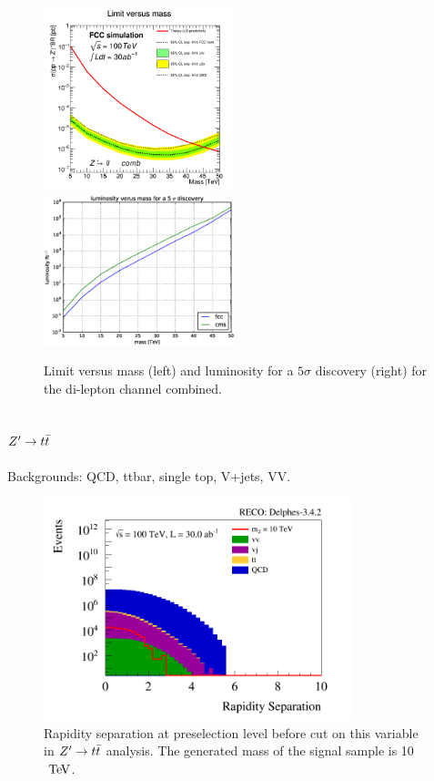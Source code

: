 \documentclass{cernrep}
\begin{document}
\begin{figure}[!htb]\centering
\includegraphics[width=0.495\textwidth]{Fig/lim_Zprime_ll_fcc_cms.png}
\includegraphics[width=0.495\textwidth]{Fig/DiscoveryPotential_ll.eps}
\caption{Limit versus mass (left) and luminosity for a $5\sigma$ discovery (right) for the
 di-lepton channel combined.}
\label{fig:zpll_lim}
\end{figure}

\subsection{$Z^{\prime} \rightarrow t\bar{t}$}
\label{subsec:Zptt}

Backgrounds: QCD, ttbar, single top, V+jets, VV. 

\begin{figure}[!htb]\centering
\includegraphics[width=0.8\textwidth]{Fig/Zptt/rapiditySeparation_sel0_nostack_log.png}
\caption{Rapidity separation at preselection level before cut on this variable in $Z^{\prime} \rightarrow t\bar{t}$ analysis. The generated mass of the signal sample is 10 $\TeV$.}
\label{fig:Zptt_sel0_rapidity}
\end{figure}
\end{document}
